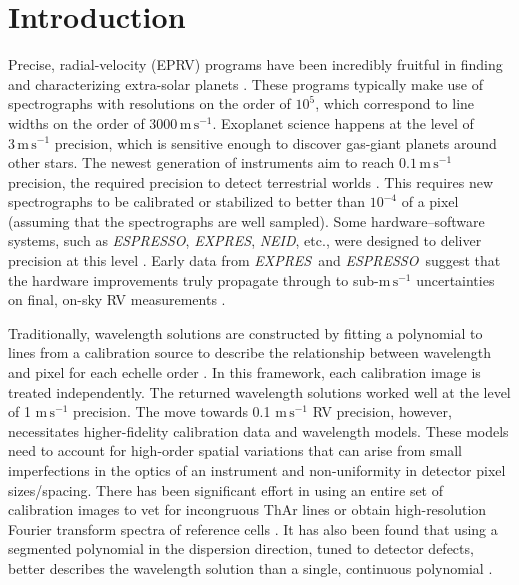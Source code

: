 \documentclass[modern]{aastex63}
\newcommand{\project}[1]{\textsl{#1}}
\newcommand{\acronym}[1]{{\small{#1}}}
\newcommand{\expres}{\project{\acronym{EXPRES}}}
\newcommand{\espresso}{\project{\acronym{ESPRESSO}}}
\newcommand{\neid}{\project{\acronym{NEID}}}
\newcommand{\eprv}{\acronym{EPRV}}
\newcommand{\mps}{\mathrm{m\,s^{-1}}}
\begin{document}

\section{Introduction} 
Precise, radial-velocity (\eprv) programs have been incredibly fruitful in finding and characterizing extra-solar planets \citep{mayor2011, bonfils2013, plavchan2015, butler2017}.  These programs typically make use of spectrographs with resolutions on the order of $10^5$, which correspond to line widths on the order of $3000\,\mps$.  Exoplanet science happens at the level of $3\,\mps$ precision, which is sensitive enough to discover gas-giant planets around other stars.  The newest generation of instruments aim  to reach $0.1\,\mps$ precision, the required precision to detect terrestrial worlds \citep{fischer2016}.  This requires new spectrographs to be calibrated or stabilized to better than $10^{-4}$ of a pixel (assuming that the spectrographs are well sampled).    Some hardware--software systems, such as \espresso, \expres,  \neid, etc., were designed to deliver precision at this level \citep{pepe2013,  jurgenson2016, neid}.  Early data from \expres\ and \espresso\ suggest that the hardware improvements truly propagate through to sub-$\mps$ uncertainties on final, on-sky RV measurements \citep{blackman2020, petersburg2020, mascareno2020}.

Traditionally, wavelength solutions are constructed by fitting a polynomial to lines from a calibration source to describe the relationship between wavelength and pixel for each echelle order \citep{butler1996, lovis2007, cersullo2019}.  In this framework, each calibration image is treated independently.  The returned wavelength solutions worked well at the level of 1 $\mps$ precision.  The move towards 0.1 $\mps$ RV precision, however, necessitates higher-fidelity calibration data and wavelength models.  These models need to account for high-order spatial variations that can arise from small imperfections in the optics of an instrument and non-uniformity in detector pixel sizes/spacing.  There has been significant effort in using an entire set of calibration images to vet for incongruous ThAr lines \citep{coffinet2019} or obtain high-resolution Fourier transform spectra of reference cells \citep{wang2020}.  It has also been found that using a segmented polynomial in the dispersion direction, tuned to detector defects, better describes the wavelength solution than a single, continuous polynomial \citep{milakovic2020}.
\end{document}
